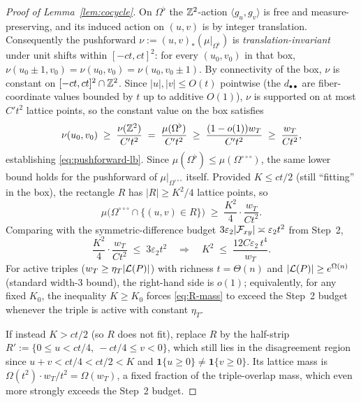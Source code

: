 \begin{proof}[Proof of Lemma~\ref{lem:cocycle}]
On $\Omega^\flat$ the $\mathbb{Z}^2$-action
$\langle g_u,g_v\rangle$ is free and measure-preserving, and its
induced action on $(u,v)$ is by integer translation.  Consequently the
pushforward $\nu:=(u,v)_\ast(\mu|_{\Omega^\flat})$ is
\emph{translation-invariant} under unit shifts within $[-ct,ct]^2$:
for every $(u_0,v_0)$ in that box,
$\nu(u_0\pm 1,v_0)=\nu(u_0,v_0)=\nu(u_0,v_0\pm 1)$.  By connectivity
of the box, $\nu$ is constant on $[-ct,ct]^2\cap\mathbb{Z}^2$.  Since
$|u|,|v|\le O(t)$ pointwise (the $d_{\bullet\bullet}$ are fiber-coordinate
values bounded by $t$ up to additive $O(1)$), $\nu$ is supported on at
most $C't^2$ lattice points, so the constant value on the box satisfies
\[
  \nu(u_0,v_0)\;\ge\;\frac{\nu(\mathbb{Z}^2)}{C't^2}\;=\;\frac{\mu(\Omega^\flat)}{C't^2}
  \;\ge\;\frac{(1-o(1))w_T}{C't^2}\;\ge\;\frac{w_T}{Ct^2},
\]
establishing \eqref{eq:pushforward-lb}.  Since
$\mu(\Omega^\flat)\le\mu(\Omega^{\circ\circ\circ})$, the same lower
bound holds for the pushforward of $\mu|_{\Omega^{\circ\circ\circ}}$
itself.  Provided
$K\le ct/2$ (still ``fitting'' in the box), the rectangle $R$ has
$|R|\ge K^2/4$ lattice points, so
\begin{equation}\label{eq:R-mass}
  \mu\bigl(\Omega^{\circ\circ\circ}\cap\{(u,v)\in R\}\bigr)
  \;\ge\;\frac{K^2}{4}\cdot\frac{w_T}{Ct^2}.
\end{equation}
Comparing with the symmetric-difference budget
$3\varepsilon_2|\mathcal{F}_{xy}|\asymp\varepsilon_2 t^2$ from Step~2,
\[
  \frac{K^2}{4}\cdot\frac{w_T}{Ct^2}\;\le\;3\varepsilon_2 t^2
  \quad\Longrightarrow\quad
  K^2\;\le\;\frac{12C\varepsilon_2\,t^4}{w_T}.
\]
For active triples ($w_T\ge\eta_T|\mathcal{L}(P)|$) with richness
$t=\Theta(n)$ and $|\mathcal{L}(P)|\ge e^{\Omega(n)}$ (standard width-3
bound), the right-hand side is $o(1)$; equivalently, for any fixed
$K_0$, the inequality $K\ge K_0$ forces \eqref{eq:R-mass} to exceed
the Step~2 budget whenever the triple is active with constant $\eta_T$.

If instead $K>ct/2$ (so $R$ does not fit), replace $R$ by the
half-strip $R':=\{0\le u<ct/4,\ -ct/4\le v<0\}$, which still lies in
the disagreement region since $u+v<ct/4<ct/2<K$ and $\mathbf{1}\{u\ge
0\}\ne\mathbf{1}\{v\ge 0\}$.  Its lattice mass is
$\Omega(t^2)\cdot w_T/t^2=\Omega(w_T)$, a fixed fraction of the
triple-overlap mass, which even more strongly exceeds the Step~2
budget.


\end{proof}
